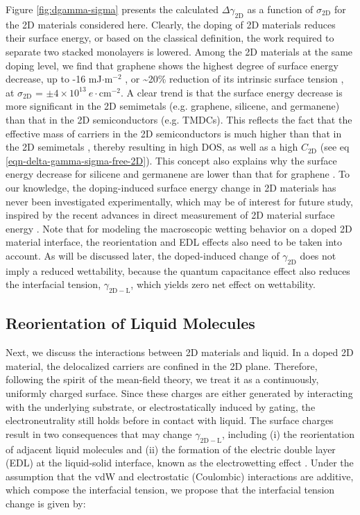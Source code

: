 \documentclass[journal=langd5,manuscript=article,email=true,hyperref=true,keywords=true]{achemso}
\begin{document}
Figure \ref{fig:dgamma-sigma} presents the calculated
\(\Delta \gamma_{\mathrm{2D}}\) as a function of
\(\sigma_{\mathrm{2D}}\) for the 2D materials considered
here. Clearly, the doping of 2D materials reduces their surface
energy, or based on the classical definition, the work required to
separate two stacked monolayers is lowered. Among the 2D materials at
the same doping level, we find that graphene shows the highest degree
of surface energy decrease, up to -16 mJ\(\cdot \mathrm{m}^{-2}\) , or
\textasciitilde{}20\% reduction of its intrinsic surface tension
\cite{shih_wetting_2013}, at \(\sigma_{\mathrm{2D}}\) =
\(\pm 4\times10^{13}\ e\cdot \mathrm{cm}^{-2}\).  A clear trend is
that the surface energy decrease is more significant in the 2D
semimetals (e.g. graphene, silicene, and germanene) than that in the
2D semiconductors (e.g. TMDCs). This reflects the fact that the
effective mass of carriers in the 2D semiconductors is much higher
than that in the 2D semimetals \cite{davies_two-dimensional_1997},
thereby resulting in high DOS, as well as a high \(C_{\mathrm{2D}}\)
(see eq \ref{eqn-delta-gamma-sigma-free-2D}). This concept also
explains why the surface energy decrease for silicene and germanene
are lower than that for graphene \cite{Yan_2013}.  To our knowledge,
the doping-induced surface energy change in 2D materials has never
been investigated experimentally, which may be of interest for future
study, inspired by the recent advances in direct measurement of 2D
material surface energy \cite{van_Engers_2017_direct_surf_gr}. Note
that for modeling the macroscopic wetting behavior on a doped 2D
material interface, the reorientation and EDL effects also need to be
taken into account.  As will be discussed later, the doped-induced
change of \(\gamma_{\mathrm{2D}}\) does not imply a reduced
wettability, because the quantum capacitance effect also reduces the
interfacial tension, \(\gamma_{\mathrm{2D-L}}\), which yields zero net
effect on wettability.


\subsection{Reorientation of Liquid Molecules}
\label{sec:orgc4a9a93}

Next, we discuss the interactions between 2D materials and liquid. In
a doped 2D material, the delocalized carriers are confined in the 2D
plane. Therefore, following the spirit of the mean-field theory, we
treat it as a continuously, uniformly charged surface. Since these
charges are either generated by interacting with the underlying
substrate, or electrostatically induced by gating, the
electroneutrality still holds before in contact with liquid. The
surface charges result in two consequences that may change
\(\gamma_{\mathrm{2D-L}}\), including (i) the reorientation of adjacent
liquid molecules \cite{ostrowski_tunable_2014} and (ii) the formation of
the electric double layer (EDL) at the liquid-solid interface, known
as the electrowetting effect
\cite{Lippmann_1908,mugele_electrowetting:_2005}. Under the assumption
that the vdW and electrostatic (Coulombic) interactions are additive,
which compose the interfacial tension, we propose that the
interfacial tension change is given by:
\end{document}
